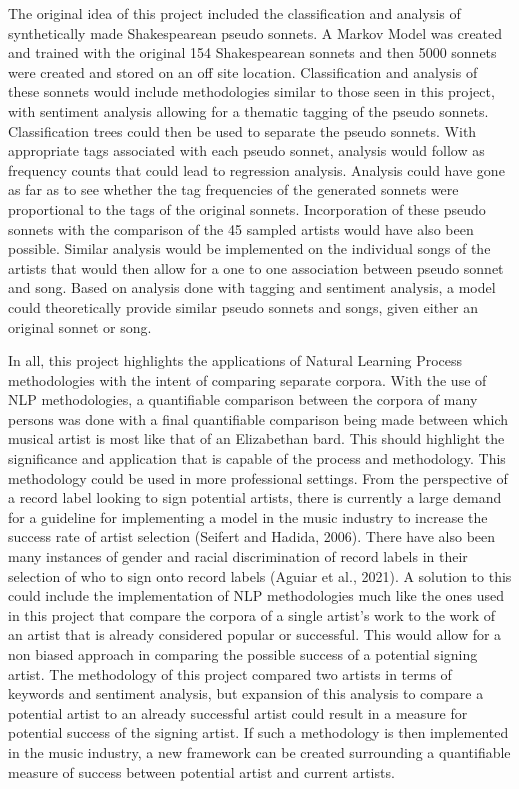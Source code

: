 \documentclass[11pt]{article}
\begin{document}
\noindent The original idea of this project included the classification and analysis of synthetically made Shakespearean pseudo sonnets. A Markov Model was created and trained with the original 154 Shakespearean sonnets and then 5000 sonnets were created and stored on an off site location. Classification and analysis of these sonnets would include methodologies similar to those seen in this project, with sentiment analysis allowing for a thematic tagging of the pseudo sonnets. Classification trees could then be used to separate the pseudo sonnets. With appropriate tags associated with each pseudo sonnet, analysis would follow as frequency counts that could lead to regression analysis. Analysis could have gone as far as to see whether the tag frequencies of the generated sonnets were proportional to the tags of the original sonnets. Incorporation of these pseudo sonnets with the comparison of the 45 sampled artists would have also been possible. Similar analysis would be implemented on the individual songs of the artists that would then allow for a one to one association between pseudo sonnet and song. Based on analysis done with tagging and sentiment analysis, a model could theoretically provide similar pseudo sonnets and songs, given either an original sonnet or song.

\noindent In all, this project highlights the applications of Natural Learning Process methodologies with the intent of comparing separate corpora. With the use of NLP methodologies, a quantifiable comparison between the corpora of many persons was done with a final quantifiable comparison being made between which musical artist is most like that of an Elizabethan bard. This should highlight the significance and application that is capable of the process and methodology. This methodology could be used in more professional settings. From the perspective of a record label looking to sign potential artists, there is currently a large demand for a guideline for implementing a model in the music industry to increase the success rate of artist selection (Seifert and Hadida, 2006). There have also been many instances of gender and racial discrimination of record labels in their selection of who to sign onto record labels (Aguiar et al., 2021). A solution to this could include the implementation of NLP methodologies much like the ones used in this project that compare the corpora of a single artist's work to the work of an artist that is already considered popular or successful. This would allow for a non biased approach in comparing the possible success of a potential signing artist. The methodology of this project compared two artists in terms of keywords and sentiment analysis, but expansion of this analysis to compare a potential artist to an already successful artist could result in a measure for potential success of the signing artist. If such a methodology is then implemented in the music industry, a new framework can be created surrounding a quantifiable measure of success between potential artist and current artists. 
\end{document}
